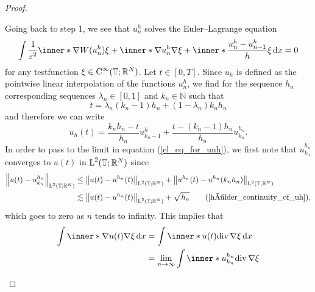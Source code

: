 \begin{proof}
\begin{description}[wide=0pt]
		Going back to step 1, we see that $ u_{ n }^{ h } $ solves the Euler--Lagrange equation
		\begin{equation}
			\label{el_eq_for_unh}
			\int
			\frac{ 1 }{ \varepsilon^{ 2 } }
			\inner*{ \nabla W ( u_{ n }^{ h } ) }  { \xi }
			+
			\inner*{ \nabla u_{ n }^{ h } }{ \nabla \xi }
			+
			\inner*{ \frac{ u_{ n }^{ h } - u_{ n - 1 }^{ h } }{ h } }{ \xi }
			\dd{ x }
			=
			0
		\end{equation}
		for any testfunction $ \xi \in \operatorname{C}^{ \infty } ( \operatorname{\mathbb{T}} ; \mathbb{ R }^{ N } )  $.
		Let $ t \in [ 0 , T ] $. Since $ u_{ h } $ is defined as the pointwise linear interpolation of the functions $ u_{ n}^{ h } $, we find for the sequence $ h_{ n } $ corresponding sequences $ \lambda_{ n } \in [ 0 , 1 ] $ and $ k_{ n } \in \mathbb{ N }$ such that 
		\begin{equation*}
			t = \lambda_{ n } ( k_{ n } - 1 ) h_{ n } + ( 1 - \lambda_{ n } ) k_{ n } h_{ n } 
		\end{equation*}
		and therefore we can write
		\begin{equation*}
			u_{ h } ( t ) 
			=
			\frac{ k_{ n } h_{ n } - t }{ h_{ n } } u_{ k_{ n } - 1 }^{ h }
			+
			\frac{ t - ( k_{ n } - 1 ) h_{ n } }{ h_{ n } }
			u_{ k_{ n } }^{ h_{ n } }.
		\end{equation*}
		In order to pass to the limit in equation (\ref{el_eq_for_unh}), we first note that $ u_{ k_{ n } }^{ h_{ n } } $ converges to $ u ( t ) $ in $ \operatorname{L}^{ 2 } ( \operatorname{\mathbb{T}} ; \mathbb{ R }^{ N } ) $ since
		\begin{align*}
			\norm{ u ( t ) - u_{ k_{ n } }^{ h_{ n } } }_{ \lp^{ 2 } ( \flattorus ; \mathbb{ R }^{ N } ) }
			& \leq
			\norm{ u ( t ) - u^{ h_{ n } } ( t ) }_{ \lp^{ 2 } ( \flattorus ; \mathbb{ R }^{ N } ) }
			+
			\norm{ u^{ h_{ n } } ( t ) - u^{ h_{ n } } ( k_{n } h_{ n } ) }_{ \lp^{ 2 } ( \flattorus, \mathbb{ R }^{ N } ) }
			\\
			& \lesssim
			\norm{ u ( t ) - u^{ h_{ n } } ( t ) }_{ \lp^{ 2 } ( \flattorus ; \mathbb{ R }^{ N } ) }
			+ 
			\sqrt{ h_{ n } }
			\tag{\ref{hölder_continuity_of_uh}},
		\end{align*}
		which goes to zero as $ n $ tends to infinity.
		This implies that 
		\begin{align*}
			\int
			\inner*{ \nabla u ( t ) }{ \nabla \xi }
			\dd{ x }
			& = 
			\int
			\inner*{ u ( t ) }{ \divg \nabla \xi  }
			\dd{ x }
			\\
			& = 
			\lim_{ n \to \infty }
			\int
			\inner*{ u_{ k_{ n } }^{ h_{ n } } }{ \divg \nabla \xi  }

\end{align*}
\end{description}
\end{proof}
